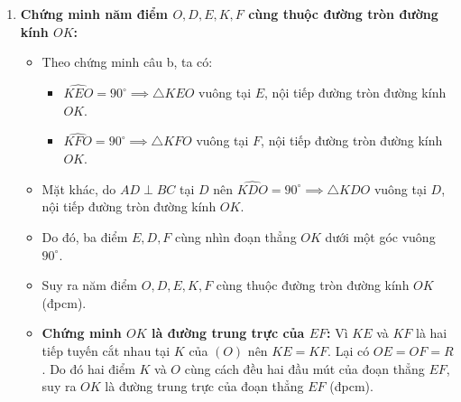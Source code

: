 \begin{ex}
{\begin{enumerate}[label=\textbf{\alph*)}]
    \item \textbf{Chứng minh năm điểm $O, D, E, K, F$ cùng thuộc đường tròn đường kính $OK$:}
    \begin{itemize}
        \item Theo chứng minh câu b, ta có:
        \begin{itemize}
            \item $\widehat{KEO} = 90^\circ \implies \triangle KEO$ vuông tại $E$, nội tiếp đường tròn đường kính $OK$.
            \item $\widehat{KFO} = 90^\circ \implies \triangle KFO$ vuông tại $F$, nội tiếp đường tròn đường kính $OK$.
        \end{itemize}
        \item Mặt khác, do $AD \perp BC$ tại $D$ nên $\widehat{KDO} = 90^\circ \implies \triangle KDO$ vuông tại $D$, nội tiếp đường tròn đường kính $OK$.
        \item Do đó, ba điểm $E, D, F$ cùng nhìn đoạn thẳng $OK$ dưới một góc vuông $90^\circ$.
        \item Suy ra năm điểm $O, D, E, K, F$ cùng thuộc đường tròn đường kính $OK$ (đpcm).
        \item \textbf{Chứng minh $OK$ là đường trung trực của $EF$:} Vì $KE$ và $KF$ là hai tiếp tuyến cắt nhau tại $K$ của $(O)$ nên $KE = KF$. Lại có $OE = OF = R$. Do đó hai điểm $K$ và $O$ cùng cách đều hai đầu mút của đoạn thẳng $EF$, suy ra $OK$ là đường trung trực của đoạn thẳng $EF$ (đpcm).
    \end{itemize}
\end{enumerate}
}
\end{ex}
